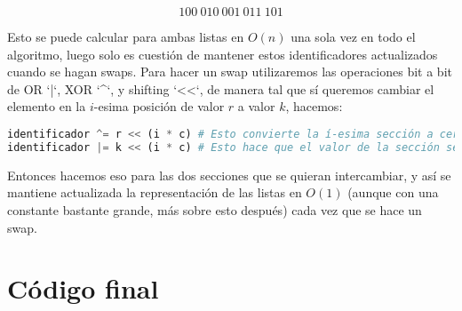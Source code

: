\documentclass{article}
\begin{document}
\[ 100 \ 010 \ 001 \ 011 \ 101 \]

Esto se puede calcular para ambas listas en $O(n)$ una sola vez en todo el algoritmo, luego solo es cuestión de mantener estos identificadores actualizados cuando se hagan swaps. Para hacer un swap utilizaremos las operaciones bit a bit de OR `|`, XOR `^`, y shifting `<<`, de manera tal que sí queremos cambiar el elemento en la $i$-esima posición de valor $r$ a valor $k$, hacemos:

\begin{lstlisting}[language=Python]
identificador ^= r << (i * c) # Esto convierte la í-esima sección a ceros
identificador |= k << (i * c) # Esto hace que el valor de la sección sea k
\end{lstlisting}

Entonces hacemos eso para las dos secciones que se quieran intercambiar, y así se mantiene actualizada la representación de las listas en $O(1)$ (aunque con una constante bastante grande, más sobre esto después) cada vez que se hace un swap.

\section*{Código final}
\end{document}
